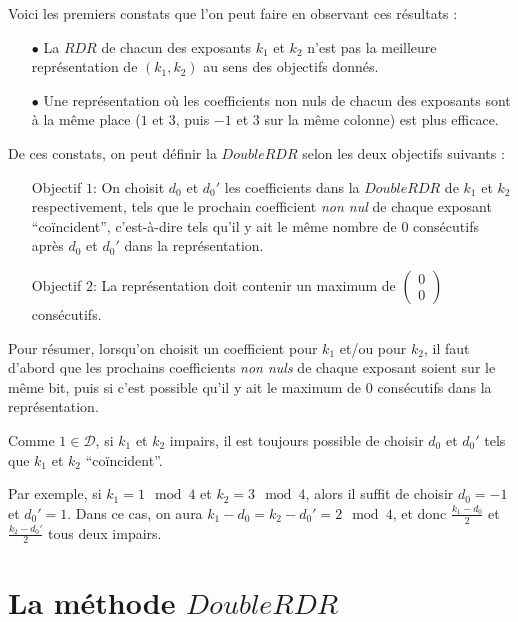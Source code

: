 \documentclass[12pt, a4paper]{memoir}
\newcommand{\doublezero}{\begin{pmatrix} 0 \\ 0 \end{pmatrix}}
\begin{document}
 \vspace{0.5cm}
 
 Voici les premiers constats que l'on peut faire en observant ces résultats : 
 \begin{itemize}
  \item [$\bullet$] La $RDR$ de chacun des exposants $k_1$ et $k_2$ n'est pas la meilleure représentation de
  $(k_1,k_2)$ au sens des objectifs donnés.
  \item [$\bullet$] Une représentation où les coefficients non nuls de chacun des exposants sont à la même place 
  ($1$ et $3$, puis $-1$ et $3$ sur la même colonne) est plus efficace.
 \end{itemize}

De ces constats, on peut définir la $DoubleRDR$ selon les deux objectifs suivants :
\begin{itemize}
 \item [Objectif $1$:] On choisit $d_0$ et $d_0'$ les coefficients dans la $DoubleRDR$ de $k_1$ et $k_2$
 respectivement, tels que le prochain coefficient \emph{non nul} de chaque exposant ``coïncident'', 
 c'est-à-dire tels qu'il y ait le même nombre de $0$ consécutifs après $d_0$ et $d_0'$ dans la représentation.
 \item [Objectif $2$:] La représentation doit contenir un maximum de $\doublezero$ consécutifs.
\end{itemize}

Pour résumer, lorsqu'on choisit un coefficient pour $k_1$ et/ou pour $k_2$, il faut d'abord que les prochains 
coefficients \emph{non nuls} de chaque exposant soient sur le même bit, puis si c'est possible qu'il y ait 
le maximum de $0$ consécutifs dans la représentation.

\begin{Remarque}
 Comme $1 \in \mathcal{D}$, si $k_1$ et $k_2$ impairs, il est toujours possible de choisir $d_0$ et $d_0'$ 
 tels que $k_1$ et $k_2$ ``coïncident''.
 
 Par exemple, si $k_1 = 1 \mod 4$ et $k_2 = 3 \mod 4$, alors il suffit de choisir $d_0 = -1$ et $d_0' = 1$.
 Dans ce cas, on aura $k_1 - d_0 = k_2 - d_0' = 2 \mod 4$, et donc $\frac{k_1 - d_0}{2}$ et $\frac{k_2 - d_0'}{2}$
 tous deux impairs.
\end{Remarque}



\section{La méthode $DoubleRDR$}
\end{document}
